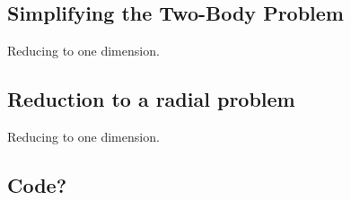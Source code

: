 \documentclass[12pt,a4paper]{report}
\begin{document}
\chapter{}

\section{Simplifying the Two-Body Problem} %
\label{sec:the_two_body_problem}

Reducing to one dimension.


\section{Reduction to a radial problem} %
\label{sec:reduction_to_a_radial_problem}

Reducing to one dimension.



\section{Code?} %
\label{sec:code}

\end{document}
